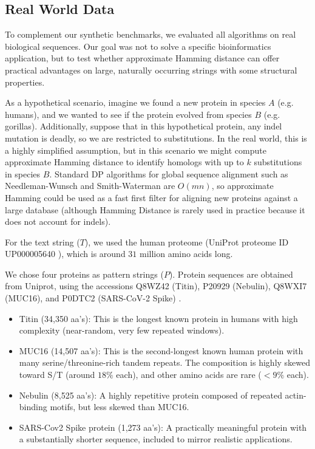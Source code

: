 \documentclass{article}
\theoremstyle{definition}
\begin{document}
\subsection{Real World Data}
\label{sec: real_world_data}

To complement our synthetic benchmarks, we evaluated all algorithms on real biological sequences.
Our goal was not to solve a specific bioinformatics application, but to test whether approximate Hamming distance can offer practical advantages on large, naturally occurring strings with some structural properties.

As a hypothetical scenario, imagine we found a new protein in species $A$ (e.g. humans), and we wanted to see if the protein evolved from species $B$ (e.g. gorillas). Additionally, suppose that in this hypothetical protein, any indel mutation is deadly, so we are restricted to substitutions. In the real world, this is a highly simplified assumption, but in this scenario we might compute approximate Hamming distance to identify homologs with up to $k$ substitutions in species $B$. Standard DP algorithms for global sequence alignment such as Needleman-Wunsch and Smith-Waterman are $O(mn)$, so approximate Hamming could be used as a fast first filter for aligning new proteins against a large database (although Hamming Distance is rarely used in practice because it does not account for indels).

For the text string ($T$), we used the human proteome (UniProt proteome ID UP000005640 \cite{uniprot}), which is around $31$ million amino acids long.

We chose four proteins as pattern strings ($P$). Protein sequences are obtained from Uniprot, using the accessions Q8WZ42 (Titin), P20929 (Nebulin), Q8WXI7 (MUC16), and P0DTC2 (SARS-CoV-2 Spike) \cite{uniprot}.
\begin{itemize}
    \item Titin (34,350 aa's): This is the longest known protein in humans with high complexity (near-random, very few repeated windows).
    
    \item MUC16 (14,507 aa's): This is the second-longest known human protein with many serine/threonine-rich tandem repeats. The composition is highly skewed toward S/T (around $18\%$ each), and other amino acids are rare ($< 9\%$ each).

    \item Nebulin (8,525 aa's): A highly repetitive protein composed of repeated actin-binding motifs, but less skewed than MUC16.

    \item SARS-Cov2 Spike protein (1,273 aa's): A practically meaningful protein with a substantially shorter sequence, included to mirror realistic applications.
    
\end{itemize}
\end{document}
